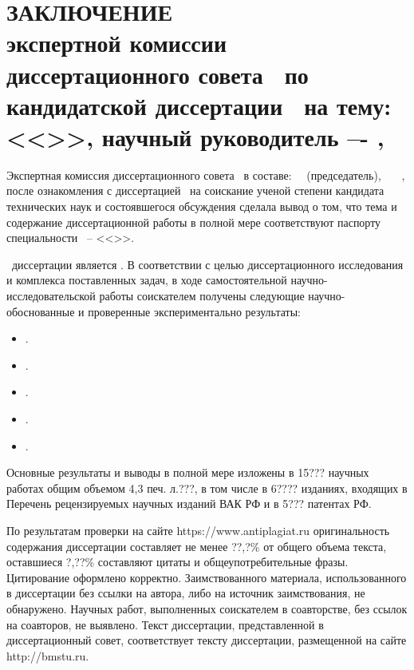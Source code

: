 
\section{ЗАКЛЮЧЕНИЕ\\
экспертной комиссии диссертационного совета \ по кандидатской диссертации \thesisAuthorLastNameFrom\ на тему: <<\thesisTitle>>, научный руководитель –- \supervisorRegaliaShort, \supervisorFioShort}



Экспертная комиссия диссертационного совета \ в составе: \dcWhomExpertOneRegalia\ \dcWhomExpertOneFIO\ (председатель), \dcWhomExpertTwoRegalia\ \dcWhomExpertTwoRegalia\, \dcWhomExpertThreeRegalia\ \dcWhomExpertThreeFIO, после ознакомления с диссертацией \thesisAuthorLastNameFrom\ на соискание ученой степени кандидата технических наук и состоявшегося обсуждения сделала вывод о том, что тема и содержание диссертационной работы в полной мере соответствуют паспорту специальности \thesisSpecialtyNumber\ -- <<\thesisSpecialtyTitle>>.

\aimTXT\ диссертации является \aimOne.
В соответствии с целью диссертационного исследования и комплекса поставленных задач, в ходе самостоятельной научно-исследовательской работы соискателем получены следующие научно-обоснованные и проверенные экспериментально результаты:
\begin{itemize}
	\item \znachimostOne.
	\item \znachimostTwo.
	\item \znachimostThree.
	\item \znachimostFour.
	\item \znachimostFive.
\end{itemize}


Основные результаты и выводы в полной мере изложены в 15??? научных работах общим объемом 4,3 печ. л.???, в том числе в 6???? изданиях, входящих в Перечень рецензируемых научных изданий ВАК РФ и в 5??? патентах РФ.

По результатам проверки на сайте https://www.antiplagiat.ru оригинальность содержания диссертации составляет не менее ??,?\% от общего объема текста, оставшиеся ?,??\% составляют цитаты и общеупотребительные фразы. Цитирование оформлено корректно. Заимствованного материала, использованного в диссертации без ссылки на автора, либо на источник заимствования, не обнаружено. Научных работ, выполненных соискателем в соавторстве, без ссылок на соавторов, не выявлено. Текст диссертации, представленной в диссертационный совет, соответствует тексту диссертации, размещенной на сайте http://bmstu.ru.

